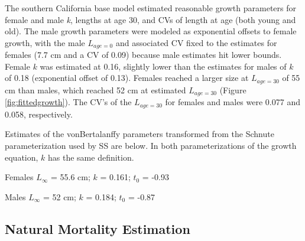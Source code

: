 \documentclass[11pt,
  english,
  a4paper,
]{article}
\begin{document}
The southern California base model estimated reasonable growth parameters for female and male \emph{k}, lengths at age 30, and CVs of length at age (both young and old). The male growth parameters were modeled as exponential offsets to female growth, with the male {\(L_{age=0}\)\leavevmode\tagmcend\tagstructend} and associated CV fixed to the estimates for females (7.7 cm and a CV of 0.09) because male estimates hit lower bounds. Female {\(k\)\leavevmode\tagmcend\tagstructend} was estimated at 0.16, slightly lower than the estimates for males of {\(k\)\leavevmode\tagmcend\tagstructend} of 0.18 (exponential offset of 0.13). Females reached a larger size at {\(L_{age=30}\)\leavevmode\tagmcend\tagstructend} of 55 cm than males, which reached 52 cm at estimated {\(L_{age=30}\)\leavevmode\tagmcend\tagstructend} (Figure \ref{fig:fittedgrowth}). The CV's of the {\(L_{age=30}\)\leavevmode\tagmcend\tagstructend} for females and males were 0.077 and 0.058, respectively.

Estimates of the vonBertalanffy parameters transformed from the Schnute parameterization used by SS are below. In both parameterizations of the growth equation, {\(k\)\leavevmode\tagmcend\tagstructend} has the same definition.

\begin{centering}

Females $L_{\infty}$ = 55.6 cm; $k$ = 0.161; $t_0$ = -0.93

Males $L_{\infty}$ = 52 cm; $k$ = 0.184; $t_0$ = -0.87

\end{centering}

\vspace{0.5cm}


\hypertarget{natural-mortality-estimation}{%
\subsection{Natural Mortality Estimation}\label{natural-mortality-estimation}}

\leavevmode\tagmcend\tagstructend
\end{document}
